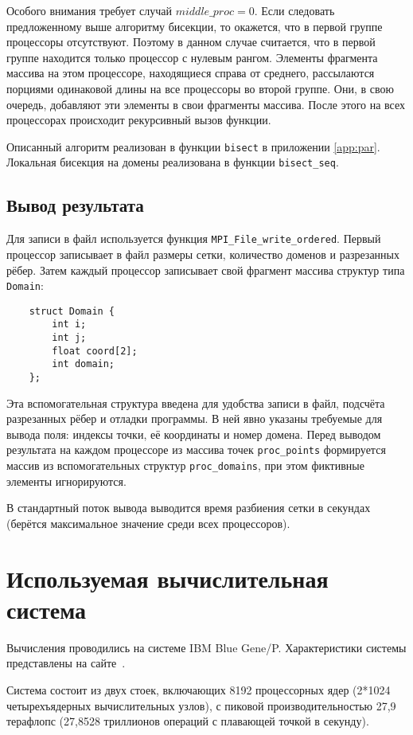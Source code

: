 \documentclass[oneside,final,14pt]{extreport}
\begin{document}
Особого внимания требует случай $middle\_proc = 0$. Если следовать
предложенному выше алгоритму бисекции, то окажется, что
в первой группе процессоры отсутствуют. Поэтому в данном случае считается,
что в первой группе находится только процессор с нулевым рангом.
Элементы фрагмента массива на этом процессоре, находящиеся справа от среднего,
рассылаются порциями одинаковой длины на все процессоры во второй группе.
Они, в свою очередь, добавляют эти элементы в свои фрагменты массива.
После этого на всех процессорах происходит рекурсивный вызов функции.

Описанный алгоритм реализован в функции \texttt{bisect} в приложении
\ref{app:par}. Локальная бисекция на домены реализована в функции
\texttt{bisect\_seq}.

\section*{Вывод результата}

Для записи в файл используется функция \texttt{MPI\_File\_write\_ordered}.
Первый процессор записывает в файл размеры сетки, количество доменов и
разрезанных рёбер. Затем каждый процессор записывает свой фрагмент массива
структур типа \texttt{Domain}:
\begin{verbatim}
    struct Domain {
        int i;
        int j;
        float coord[2];
        int domain;
    };
\end{verbatim}
Эта вспомогательная структура введена для
удобства записи в файл, подсчёта разрезанных рёбер и отладки программы. В ней явно указаны требуемые для
вывода поля: индексы точки, её координаты и номер домена. Перед выводом
результата на каждом процессоре из массива точек \texttt{proc\_points}
формируется массив из вспомогательных структур \texttt{proc\_domains}, при этом
фиктивные элементы игнорируются.

В стандартный поток вывода выводится время разбиения сетки в секундах
(берётся максимальное значение среди всех процессоров).

\chapter*{Используемая вычислительная система}

Вычисления проводились на системе IBM Blue Gene/P.
Характеристики системы представлены на сайте~\cite{bluegene}.

Система состоит из двух стоек, включающих 8192 процессорных ядер
(2*1024 четырехъядерных вычислительных узлов), с пиковой производительностью
27,9 терафлопс (27,8528 триллионов операций с плавающей точкой в секунду).
\end{document}
